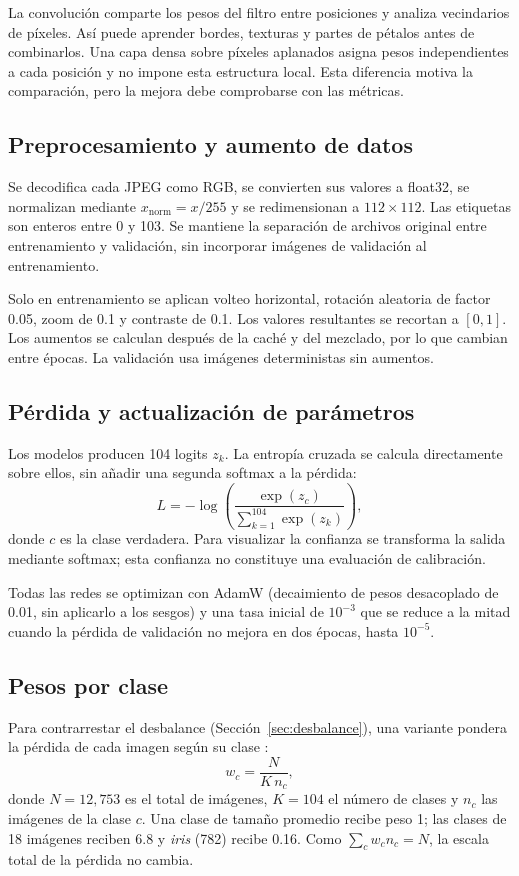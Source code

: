 La convolución comparte los pesos del filtro entre posiciones y analiza
vecindarios de píxeles. Así puede aprender bordes, texturas y partes de pétalos
antes de combinarlos. Una capa densa sobre píxeles aplanados asigna pesos
independientes a cada posición y no impone esta estructura local. Esta diferencia
motiva la comparación, pero la mejora debe comprobarse con las métricas.

\subsection{Preprocesamiento y aumento de datos}

Se decodifica cada JPEG como RGB, se convierten sus valores a float32, se
normalizan mediante $x_{\mathrm{norm}}=x/255$ y se redimensionan a $112\times112$.
Las etiquetas son enteros entre 0 y 103. Se mantiene la separación de archivos
original entre entrenamiento y validación, sin incorporar imágenes de validación
al entrenamiento.

Solo en entrenamiento se aplican volteo horizontal, rotación aleatoria de factor
0.05, zoom de 0.1 y contraste de 0.1. Los valores resultantes se recortan a $[0,1]$.
Los aumentos se calculan después de la caché y del mezclado, por lo que cambian
entre épocas. La validación usa imágenes deterministas sin aumentos.

\subsection{Pérdida y actualización de parámetros}

Los modelos producen 104 logits $z_k$. La entropía cruzada se calcula directamente
sobre ellos, sin añadir una segunda softmax a la pérdida:
\begin{equation}
L=-\log\left(\frac{\exp(z_c)}{\sum_{k=1}^{104}\exp(z_k)}\right),
\end{equation}
donde $c$ es la clase verdadera. Para visualizar la confianza se transforma la
salida mediante softmax; esta confianza no constituye una evaluación de calibración.

Todas las redes se optimizan con AdamW \autocite{loshchilov2019adamw}
(decaimiento de pesos desacoplado de 0.01, sin aplicarlo a los sesgos) y una
tasa inicial de $10^{-3}$ que se reduce a la mitad cuando la pérdida de
validación no mejora en dos épocas, hasta $10^{-5}$.

\subsection{Pesos por clase}
\label{sec:pesos}

Para contrarrestar el desbalance (Sección~\ref{sec:desbalance}), una variante
pondera la pérdida de cada imagen según su clase \autocite{he2009imbalanced}:
\begin{equation}
w_c = \frac{N}{K\,n_c},
\end{equation}
donde $N=12{,}753$ es el total de imágenes, $K=104$ el número de clases y $n_c$
las imágenes de la clase $c$. Una clase de tamaño promedio recibe peso 1; las
clases de 18 imágenes reciben 6.8 y \emph{iris} (782) recibe 0.16. Como
$\sum_c w_c n_c = N$, la escala total de la pérdida no cambia.
